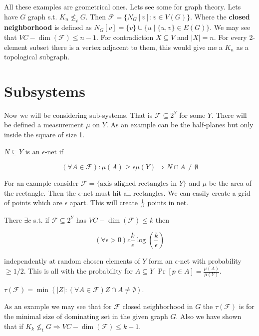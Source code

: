 All these examples are geometrical ones. Lets see some for graph theory. Lets have $G$ graph s.t. $K_{n} \nleq_{t} G$. Then $\mathcal{F} = \{N_{G}[v] : v \in V(G)\}$. Where the \textbf{closed neighborhood} is defined as $N_{G}[v] = \{v\} \cup \{u \mid \{u,v\} \in E(G)\}$. We may see that $VC-\dim(\mathcal{F}) \leq n-1$. For contradiction $X \subseteq V$ and $|X| = n$. For every 2-element subset there is a vertex adjacent to them, this would give me a $K_{n}$ as a topological subgraph.

\section{Subsystems}

Now we will be considering sub-systems. That is $\mathcal{F} \subseteq 2^{Y}$ for some $Y$. There will be defined a measurement $\mu$ on $Y$. As an example can be the half-planes but only inside the square of size 1.

\begin{defn}
	$N \subseteq Y$ is an $\epsilon$-net if
	
	$$
	(\forall A \in \mathcal{F}) : \mu(A) \geq \epsilon \mu(Y) \Rightarrow N \cap A \neq \emptyset
	$$
\end{defn}

For an example consider $\mathcal{F} = \{\text{axis aligned rectangles in }Y\}$ and $\mu$ be the area of the rectangle. Then the $\epsilon$-net must hit all rectangles. We can easily create a grid of points which are $\epsilon$ apart. This will create $\frac{1}{\epsilon^2}$ points in net.

\begin{thm}
	There $\exists c$ s.t. if $\mathcal{F} \subseteq 2^Y$ has $VC-\dim(\mathcal{F}) \leq k$ then
	
	$$
	(\forall \epsilon > 0) c \frac{k}{\epsilon} \log \left( \frac{k}{\epsilon} \right)
	$$
	
	independently at random chosen elements of $Y$ form an $\epsilon$-net with probability $\geq 1/2$. This is all with the probability for $A \subseteq Y$ $\Pr [p \in A] = \frac{\mu(A)}{\mu(Y)}$.
\end{thm}

\begin{defn}
	$\tau (\mathcal{F}) = \min \left( |Z| : (\forall A \in \mathcal{F}) Z \cap A \neq \emptyset \right)$.
\end{defn}

As an example we may see that for $\mathcal{F}$ closed neighborhood in $G$ the $\tau(\mathcal{F})$ is for the minimal size of dominating set in the given graph $G$. Also we have shown that if $K_{k} \nleq_{t} G \Rightarrow VC-\dim(\mathcal{F}) \leq k - 1$.

